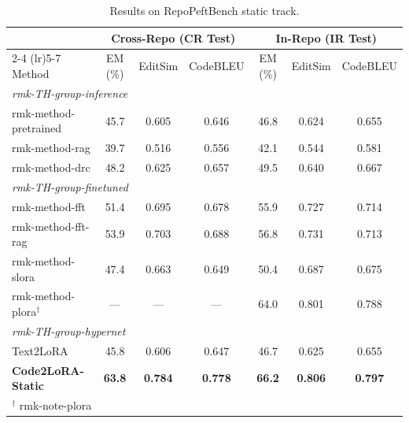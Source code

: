 \documentclass[11pt]{article}
\newcommand{\UseMacro}[1]{\csname rmk-#1\endcsname}
\newcommand{\codelora}{Code2LoRA\xspace}
\newcommand{\repopeftbench}{RepoPeftBench\xspace}
\newcommand{\codelorastatic}{\codelora-Static\xspace}
\newcommand{\textlora}{Text2LoRA\xspace}
\begin{document}
\begin{table}[t]
\begin{small}
\begin{center}
\caption{Results on \repopeftbench{} static track.}\label{tab:main_results}

\begin{tabular}{l@{\hskip 8pt}ccc@{\hskip 12pt}ccc}
\toprule
& \multicolumn{3}{c}{\textbf{Cross-Repo (CR Test)}} & \multicolumn{3}{c}{\textbf{In-Repo (IR Test)}} \\
\cmidrule(lr){2-4} \cmidrule(lr){5-7}
Method & EM (\%) & EditSim & CodeBLEU & EM (\%) & EditSim & CodeBLEU \\
\midrule
\multicolumn{7}{l}{\emph{\UseMacro{TH-group-inference}}} \\
\midrule
\UseMacro{method-pretrained} & 45.7 & 0.605 & 0.646 & 46.8 & 0.624 & 0.655 \\
\UseMacro{method-rag} & 39.7 & 0.516 & 0.556 & 42.1 & 0.544 & 0.581 \\
\UseMacro{method-drc} & 48.2 & 0.625 & 0.657 & 49.5 & 0.640 & 0.667 \\
\midrule
\multicolumn{7}{l}{\emph{\UseMacro{TH-group-finetuned}}} \\
\midrule
\UseMacro{method-fft} & 51.4 & 0.695 & 0.678 & 55.9 & 0.727 & 0.714 \\
\UseMacro{method-fft-rag} & 53.9 & 0.703 & 0.688 & 56.8 & 0.731 & 0.713 \\
\UseMacro{method-slora} & 47.4 & 0.663 & 0.649 & 50.4 & 0.687 & 0.675 \\
\UseMacro{method-plora}$^\dag$ & --- & --- & --- & 64.0 & 0.801 & 0.788 \\
\midrule
\multicolumn{7}{l}{\emph{\UseMacro{TH-group-hypernet}}} \\
\midrule
\textlora{} & 45.8 & 0.606 & 0.647 & 46.7 & 0.625 & 0.655 \\
\textbf{\codelorastatic{}} & \textbf{63.8} & \textbf{0.784} & \textbf{0.778} & \textbf{66.2} & \textbf{0.806} & \textbf{0.797} \\
\bottomrule
\multicolumn{7}{l}{\footnotesize $^\dag$ \UseMacro{note-plora}} \\
\end{tabular}


\end{center}
\end{small}
\end{table}
\end{document}
